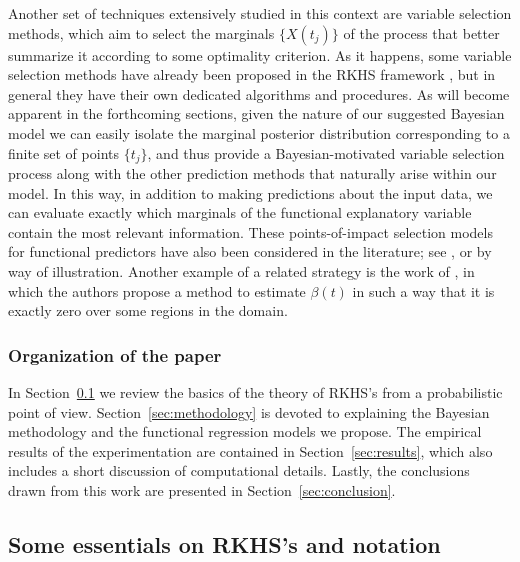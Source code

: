 \documentclass[ba]{imsart}
\numberwithin{equation}{section}
\theoremstyle{plain}
\begin{document}
Another set of techniques extensively studied in this context are variable selection methods, which aim to select the marginals \(\{X(t_j)\}\) of the process that better summarize it according to some optimality criterion. As it happens, some variable selection methods have already been proposed in the RKHS framework \citep[see for example][]{berrendero2019rkhs}, but in general they have their own dedicated algorithms and procedures. As will become apparent in the forthcoming sections, given the nature of our suggested Bayesian model we can easily isolate the marginal posterior distribution corresponding to a finite set of points \(\{t_j\}\), and thus provide a Bayesian-motivated variable selection process along with the other prediction methods that naturally arise within our model. In this way, in addition to making predictions about the input data, we can evaluate exactly which marginals of the functional explanatory variable contain the most relevant information. These points-of-impact selection models for functional predictors have also been considered in the  literature; see \citet{poss2020superconsistent}, \citet{berrendero2016variable} or \citet{ferraty2010most} by way of illustration. Another example of a related strategy is the work of \citet{james2009functional}, in which the authors propose a method to estimate \(\beta(t)\) in such a way that it is exactly zero over some regions in the domain.

\subsubsection{Organization of the paper}

In Section~\ref{sec:rkhs} we review the basics of the theory of RKHS's from a probabilistic point of view. Section~\ref{sec:methodology} is devoted to explaining the Bayesian methodology and the functional regression models we propose. The empirical results of the experimentation are contained in Section~\ref{sec:results}, which also includes a short discussion of computational details. Lastly, the conclusions drawn from this work are presented in Section~\ref{sec:conclusion}.

\subsection{Some essentials on RKHS's and notation}\label{sec:rkhs}
\end{document}
